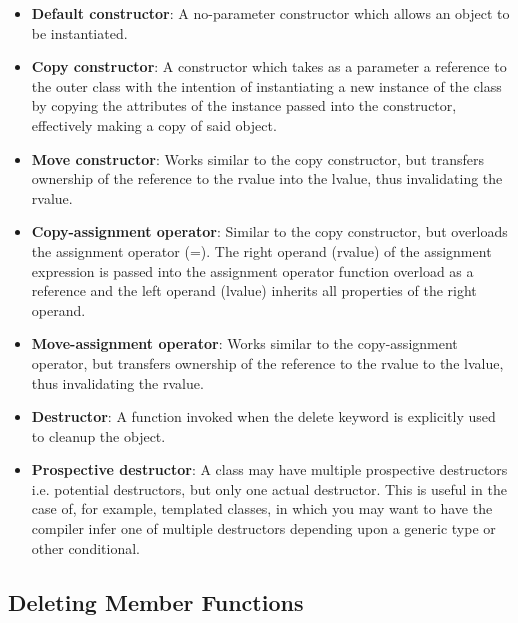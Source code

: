 \documentclass{article}
\begin{document}
\begin{itemize}


\item{%
    \textbf{Default constructor}: A no-parameter constructor which allows an object to be instantiated.
}

\item{%
    \textbf{Copy constructor}: A constructor which takes as a parameter a reference to the outer class with the
    intention of instantiating a new instance of the class by copying the attributes of the instance passed into
    the constructor, effectively making a copy of said object.
}

\item{%
    \textbf{Move constructor}: Works similar to the copy constructor, but transfers ownership of the reference
    to the rvalue into the lvalue, thus invalidating the rvalue.
}

\item{%
    \textbf{Copy-assignment operator}: Similar to the copy constructor, but overloads the assignment operator
    (=). The right operand (rvalue) of the assignment expression is passed into the assignment operator
    function overload as a reference and the left operand (lvalue) inherits all properties of the right
    operand.
}

\item{%
    \textbf{Move-assignment operator}: Works similar to the copy-assignment operator, but transfers ownership
    of the reference to the rvalue to the lvalue, thus invalidating the rvalue.
}

\item{%
    \textbf{Destructor}: A function invoked when the delete keyword is explicitly used to cleanup the object.
}

\item{%
    \textbf{Prospective destructor}: A class may have multiple prospective destructors i.e. potential
    destructors, but only one actual destructor. This is useful in the case of, for example, templated
    classes, in which you may want to have the compiler infer one of multiple destructors depending upon a
    generic type or other conditional.
}

\end{itemize}

\subsection{Deleting Member Functions}
\end{document}
